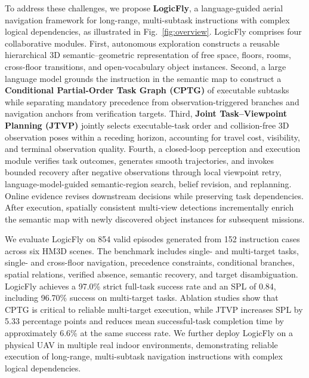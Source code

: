 \documentclass[letterpaper,10pt,journal]{IEEEtran}
\begin{document}
To address these challenges, we propose \textbf{LogicFly}, a language-guided aerial navigation framework for long-range, multi-subtask instructions with complex logical dependencies, as illustrated in Fig.~\ref{fig:overview}. LogicFly comprises four collaborative modules. First, autonomous exploration constructs a reusable hierarchical 3D semantic--geometric representation of free space, floors, rooms, cross-floor transitions, and open-vocabulary object instances. Second, a large language model grounds the instruction in the semantic map to construct a \textbf{Conditional Partial-Order Task Graph (CPTG)} of executable subtasks while separating mandatory precedence from observation-triggered branches and navigation anchors from verification targets. Third, \textbf{Joint Task--Viewpoint Planning (JTVP)} jointly selects executable-task order and collision-free 3D observation poses within a receding horizon, accounting for travel cost, visibility, and terminal observation quality. Fourth, a closed-loop perception and execution module verifies task outcomes, generates smooth trajectories, and invokes bounded recovery after negative observations through local viewpoint retry, language-model-guided semantic-region search, belief revision, and replanning. Online evidence revises downstream decisions while preserving task dependencies. After execution, spatially consistent multi-view detections incrementally enrich the semantic map with newly discovered object instances for subsequent missions.

We evaluate LogicFly on 854 valid episodes generated from 152 instruction cases across six HM3D scenes. The benchmark includes single- and multi-target tasks, single- and cross-floor navigation, precedence constraints, conditional branches, spatial relations, verified absence, semantic recovery, and target disambiguation. LogicFly achieves a 97.0\% strict full-task success rate and an SPL of 0.84, including 96.70\% success on multi-target tasks. Ablation studies show that CPTG is critical to reliable multi-target execution, while JTVP increases SPL by 5.33 percentage points and reduces mean successful-task completion time by approximately 6.6\% at the same success rate. We further deploy LogicFly on a physical UAV in multiple real indoor environments, demonstrating reliable execution of long-range, multi-subtask navigation instructions with complex logical dependencies.
\end{document}

